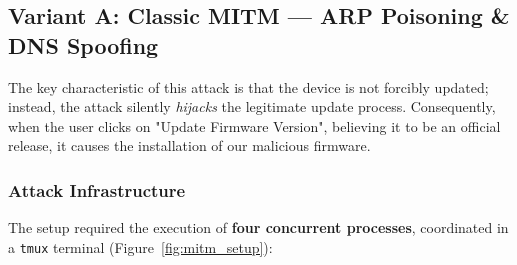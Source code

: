 \subsection{Variant A: Classic MITM --- ARP Poisoning \& DNS Spoofing}
The key characteristic of this attack is that the device is not forcibly updated; instead, the attack silently \emph{hijacks} the legitimate update process. Consequently, when the user clicks on "Update Firmware Version", believing it to be an official release, it causes the installation of our malicious firmware.

\subsubsection{Attack Infrastructure}
The setup required the execution of \textbf{four concurrent processes}, coordinated in a \texttt{tmux} terminal (Figure~\ref{fig:mitm_setup}):

